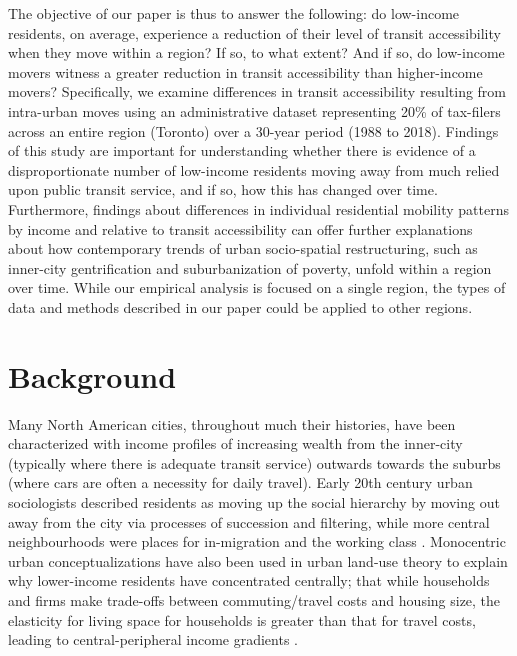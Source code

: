 The objective of our paper is thus to answer the following: do low-income residents, on average, experience a reduction of their level of transit accessibility when they move within a region? If so, to what extent? And if so, do low-income movers witness a greater reduction in transit accessibility than higher-income movers? Specifically, we examine differences in transit accessibility resulting from intra-urban moves using an administrative dataset representing 20\% of tax-filers across an entire region (Toronto) over a 30-year period (1988 to 2018). Findings of this study are important for understanding whether there is evidence of a disproportionate number of low-income residents moving away from much relied upon public transit service, and if so, how this has changed over time. Furthermore, findings about differences in individual residential mobility patterns by income and relative to transit accessibility can offer further explanations about how contemporary trends of urban socio-spatial restructuring, such as inner-city gentrification and suburbanization of poverty, unfold within a region over time. While our empirical analysis is focused on a single region, the types of data and methods described in our paper could be applied to other regions.







\section{Background}

Many North American cities, throughout much their histories, have been characterized with income profiles of increasing wealth from the inner-city (typically where there is adequate transit service) outwards towards the suburbs (where cars are often a necessity for daily travel). Early 20th century urban sociologists described residents as moving up the social hierarchy by moving out away from the city via processes of succession and filtering, while more central neighbourhoods were places for in-migration and the working class \cite{burgess_growth_1925}. Monocentric urban conceptualizations have also been used in urban land-use theory \cite{alonso_location_1964} to explain why lower-income residents have concentrated centrally; that while households and firms make trade-offs between commuting/travel costs and housing size, the elasticity for living space for households is greater than that for travel costs, leading to central-peripheral income gradients \cite{becker_theory_1965,glaeser_why_2008}. 

